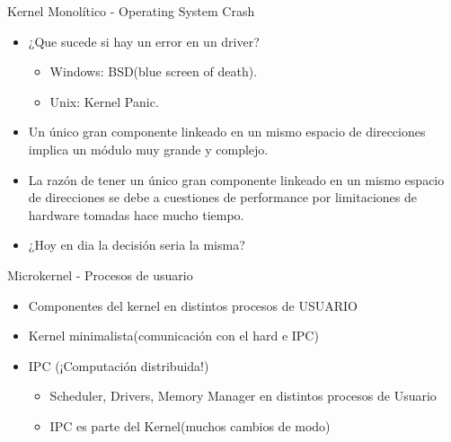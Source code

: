 \begin{frame}{Kernel Monolítico - Operating System Crash}

 \begin{itemize}
    \item ¿Que sucede si hay un error en un driver?
    \begin{itemize}
    	\item Windows: BSD(blue screen of death).
    	\item Unix: Kernel Panic.
    \end{itemize}
    \item Un único gran componente linkeado en un mismo espacio de direcciones implica un módulo muy grande y complejo.
    \item La razón de tener un único gran componente linkeado en un mismo espacio de direcciones se debe a cuestiones de performance por limitaciones de hardware tomadas hace mucho tiempo.
     \item ¿Hoy en dia la decisión seria la misma? 
   \end{itemize} 
\end{frame}


\begin{frame}{Microkernel - Procesos de usuario}
  \begin{center}
   \end{center}
 \begin{itemize}
    \item Componentes del kernel en distintos procesos de USUARIO
    \item Kernel minimalista(comunicación con el hard e IPC)
    \item IPC (¡Computación distribuida!) 
    \begin{itemize}
            \item \small Scheduler, Drivers, Memory Manager en distintos procesos de Usuario
            \item \small IPC es parte del Kernel(muchos cambios de modo)
         \end{itemize} 
   \end{itemize} 
\end{frame}


